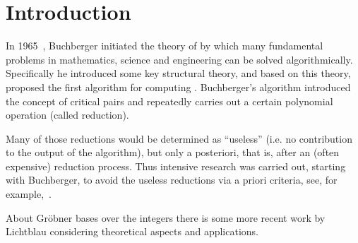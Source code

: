 \section{Introduction}
\label{sec:intro}
In 1965~\cite{bGroebner1965, bGroebner1965eng}, Buchberger initiated the theory
of \gbs by which many fundamental problems in mathematics, science
and engineering can be solved algorithmically. Specifically he introduced some key
structural theory, and based on
this theory, proposed the first algorithm for computing \gbs.
Buchberger's algorithm introduced the concept of critical pairs and repeatedly carries out a certain
polynomial operation (called reduction).

Many of those reductions would be
determined as ``useless'' (i.e. no contribution to the output of the algorithm),
but only a posteriori, that is, after an (often expensive) reduction process.
Thus intensive research was carried out, starting with Buchberger, to avoid the
useless reductions via a priori criteria, see,  for
example,~\cite{bGroebnerCriterion1979,buchberger2ndCriterion1985,gmInstallation1988}.

About Gr\"obner bases over the integers there is some more recent work by
Lichtblau \cite{lichtblau2012} considering theoretical aspects and applications.

%
%
